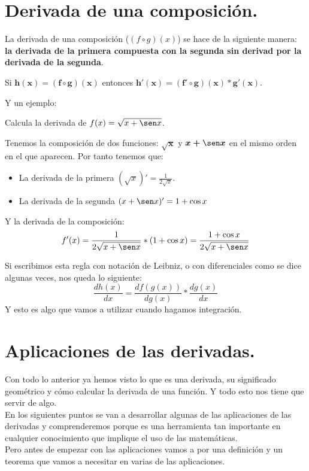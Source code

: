 \documentclass[a4paper,11pt,answers]{exam}
\begin{document}
\section{Derivada de una composición.}
La derivada de una composición ($(f \circ g)(x)$) se hace de la siguiente manera: \textbf{la derivada de la primera compuesta con la segunda sin derivad por la derivada de la segunda}.
\begin{center}
Si $\boldsymbol{h(x) = (f \circ g)(x)}$ entonces $\boldsymbol{h'(x) = (f' \circ g)(x) * g'(x)}$.
\end{center}
Y un ejemplo:
\begin{questions}
\question Calcula la derivada de $f(x) = \sqrt{x + \sen x}$.
\begin{solution}
Tenemos la composición de dos funciones: $\boldsymbol{\sqrt{x}}$ y $\boldsymbol{x + \sen x}$ en el mismo orden en el que aparecen. Por tanto tenemos que:
\begin{itemize}
	\item La derivada de la primera $(\sqrt{x})' = \frac{1}{2\sqrt{x}}$.
	\item La derivada de la segunda $(x + \sen x)' = 1 + \cos x$
\end{itemize}
Y la derivada de la composición:
\[f'(x) = \frac{1}{2\sqrt{x + \sen x}}*(1 + \cos x) = \frac{1 + \cos x}{2\sqrt{x + \sen x}}\]
\end{solution}
\end{questions}

Si escribimos esta regla con notación de Leibniz, o con diferenciales como se dice algunas veces, nos queda lo siguiente:
\[\frac{d h(x)}{dx} = \frac{d f(g(x))}{d g(x)} * \frac{d g(x)}{dx}\]
Y esto es algo que vamos a utilizar cuando hagamos integración.

\section{Aplicaciones de las derivadas.}
Con todo lo anterior ya hemos visto lo que es una derivada, su significado geométrico y cómo calcular la derivada de una función. Y todo esto nos tiene que servir de algo.\\
En los siguientes puntos se van a desarrollar algunas de las aplicaciones de las derivadas y comprenderemos porque es una herramienta tan importante en cualquier conocimiento que implique el uso de las matemáticas.\\

Pero antes de empezar con las aplicaciones vamos a por una definición y un teorema que vamos a necesitar en varias de las aplicaciones.
\end{document}
